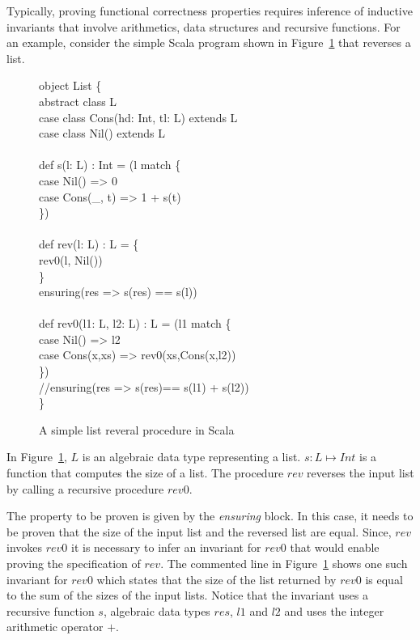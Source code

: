 Typically, proving functional correctness properties requires inference of inductive invariants
that involve arithmetics, data structures and recursive functions. 
For an example, consider the simple Scala program shown in Figure~\ref{fig:eg} that reverses a list. 
%
\begin{figure}
\begin{myprogram}
object List \{ \\
\pnl \>    abstract class L \\
\pnl \>    case class Cons(hd: Int, tl: L) extends L \\
\pnl \>    case class Nil() extends L \\
\\
\pnl \>    def s(l: L) : Int = (l match \{ \\
\pnl \> \>      case Nil() => 0 \\
\pnl \> \>      case Cons(\_, t) => 1 + s(t) \\
\pnl \>    \}) \\
\\
\pnl \>    def rev(l: L) : L = \{ \\
\pnl \> \>      rev0(l, Nil())  \\
\pnl \>    \} \\
\pnl \>    ensuring(res => s(res) == s(l))\\
\\    
\pnl \>    def rev0(l1: L, l2: L) : L = (l1 match \{ \\
\pnl \> \>    case Nil() => l2 \\
\pnl \> \>    case Cons(x,xs) => rev0(xs,Cons(x,l2)) \\
\pnl \>    \}) \\ 
\pnl \>    //ensuring(res => s(res)== s(l1) + s(l2)) \\
\}
\end{myprogram}
\caption{A simple list reveral procedure in Scala} \label{fig:eg}
\end{figure}
%
In Figure~\ref{fig:eg}, $L$ is an algebraic data type representing a list. $s: L \mapsto Int$ is a function 
that computes the size of a list. The procedure $rev$ reverses the input list by calling a recursive procedure 
$rev0$. 

The property to be proven is given by the \emph{ensuring} block. In this case, it needs to be proven
that the size of the input list and the reversed list are equal. Since, $rev$ invokes $rev0$ it is necessary to 
infer an invariant for $rev0$ that would enable proving the specification of $rev$. 
The commented line in Figure~\ref{fig:eg} shows one such invariant for $rev0$ which states that
the size of the list returned by $rev0$ is equal to the sum of the sizes of the input lists.
Notice that the invariant uses a recursive function $s$, algebraic data types $res$, $l1$ and $l2$
and uses the integer arithmetic operator $+$.

